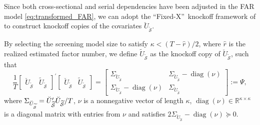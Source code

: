 ﻿\documentclass[12pt]{article}
\newcommand{\0}{\mbox{\bf 0}}
\theoremstyle{plain}%
\theoremstyle{definition}
\DeclareMathOperator{\diag}{diag}
\begin{document}
Since both cross-sectional and serial dependencies have been adjusted in the FAR model \eqref{eq:transformed_FAR}, we can adopt the \textquotedblleft Fixed-X\textquotedblright\ knockoff framework of \citet{BarberCandes2015} to construct knockoff copies of the covariates $\breve{U}_{\widetilde{\mathcal{S}}}$. 

By selecting the screening model size to satisfy $\kappa < (T-\widehat r)/2$, where $\widehat r$ is the realized estimated factor number, we define $\widetilde{U}_{\widetilde{\mathcal{S}}}$ as the knockoff copy of $\breve{U}_{\widetilde{\mathcal{S}}}$, such that
\begin{equation}
\frac{1}{T}
\begin{bmatrix}
\breve{U}_{\widetilde{\mathcal{S}}} & \widetilde{U}_{\widetilde{\mathcal{S}}}
\end{bmatrix}^\prime
\begin{bmatrix}
\breve{U}_{\widetilde{\mathcal{S}}} & \widetilde{U}_{\widetilde{\mathcal{S}}}
\end{bmatrix}
=
\begin{bmatrix}
\Sigma_{\breve{U}_{\widetilde{\mathcal{S}}}} & \Sigma_{\breve{U}_{\widetilde{\mathcal{S}}}} - \operatorname{diag}(\nu) \\
\Sigma_{\breve{U}_{\widetilde{\mathcal{S}}}} - \operatorname{diag}(\nu) & \Sigma_{\breve{U}_{\widetilde{\mathcal{S}}}}
\end{bmatrix}
:= \Psi, \label{eq:Psi}
\end{equation}
where $\Sigma _{\breve{U}_{{\widetilde{\mathcal{S}}}}}=\breve{U}_{{%
\widetilde{\mathcal{S}}}}^{\prime}\breve{U}_{{\widetilde{\mathcal{S}}}}/T $, $\nu$ is a nonnegative vector of length $\kappa$,  $\operatorname{diag}(\nu) \in \mathbb{R}^{\kappa \times \kappa}$ is a diagonal matrix with entries from $\nu$ and satisfies $%
2\Sigma _{\breve{U}_{{\widetilde{\mathcal{S}}}}}-\diag(\nu )\succeq 0$. 
\end{document}
